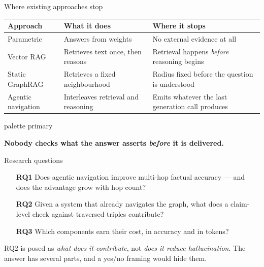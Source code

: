 \documentclass[aspectratio=169,12pt]{beamer}
\newcommand{\takeaway}[1]{%
  \vspace{1.5mm}%
  \begin{beamercolorbox}[wd=\dimexpr\textwidth-4.4mm\relax,sep=2.2mm,
    rounded=true]{palette primary}%
    \color{agrdark}\small\raggedright\textbf{#1}%
  \end{beamercolorbox}}
\begin{document}
\begin{frame}{Where existing approaches stop}
  \begin{table}
    \small
    \begin{tabular}{@{}L{31mm}L{40mm}L{40mm}@{}}
      \toprule
      \textbf{Approach} & \textbf{What it does} & \textbf{Where it stops} \\
      \midrule
      Parametric        & Answers from weights
                        & No external evidence at all \\
      Vector RAG        & Retrieves text once, then reasons
                        & Retrieval happens \emph{before} reasoning begins \\
      Static GraphRAG   & Retrieves a fixed neighbourhood
                        & Radius fixed before the question is understood \\
      Agentic navigation & Interleaves retrieval and reasoning
                        & Emits whatever the last generation call produces \\
      \bottomrule
    \end{tabular}
  \end{table}
  \takeaway{Nobody checks what the answer asserts \emph{before} it is
    delivered.}
\end{frame}

\begin{frame}{Research questions}
  \begin{enumerate}
    \item[\textbf{RQ1}] Does agentic navigation improve multi-hop factual
      accuracy --- and does the advantage \alert{grow with hop count}?
      \vspace{2mm}
    \item[\textbf{RQ2}] Given a system that already navigates the graph, what
      does a claim-level check against traversed triples \alert{contribute}?
      \vspace{2mm}
    \item[\textbf{RQ3}] Which components earn their cost, in accuracy and in
      \alert{tokens}?
  \end{enumerate}
  \vspace{3mm}
  {\small RQ2 is posed as \emph{what does it contribute}, not \emph{does it
    reduce hallucination}. The answer has several parts, and a yes/no framing
    would hide them.}
\end{frame}
\end{document}
